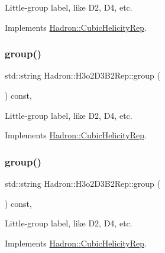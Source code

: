 Little-\/group label, like D2, D4, etc. 

Implements \mbox{\hyperlink{structHadron_1_1CubicHelicityRep_a101a7d76cd8ccdad0f272db44b766113}{Hadron\+::\+Cubic\+Helicity\+Rep}}.

\mbox{\label{structHadron_1_1H3o2D3B2Rep_a5f90a196c20d41622da336eefc77cfd1}} 
\subsubsection{\texorpdfstring{group()}{group()}\hspace{0.1cm}{\footnotesize\ttfamily [2/3]}}
{\footnotesize\ttfamily std\+::string Hadron\+::\+H3o2\+D3\+B2\+Rep\+::group (\begin{DoxyParamCaption}{ }\end{DoxyParamCaption}) const\hspace{0.3cm}{\ttfamily [inline]}, {\ttfamily [virtual]}}

Little-\/group label, like D2, D4, etc. 

Implements \mbox{\hyperlink{structHadron_1_1CubicHelicityRep_a101a7d76cd8ccdad0f272db44b766113}{Hadron\+::\+Cubic\+Helicity\+Rep}}.

\mbox{\label{structHadron_1_1H3o2D3B2Rep_a5f90a196c20d41622da336eefc77cfd1}} 
\subsubsection{\texorpdfstring{group()}{group()}\hspace{0.1cm}{\footnotesize\ttfamily [3/3]}}
{\footnotesize\ttfamily std\+::string Hadron\+::\+H3o2\+D3\+B2\+Rep\+::group (\begin{DoxyParamCaption}{ }\end{DoxyParamCaption}) const\hspace{0.3cm}{\ttfamily [inline]}, {\ttfamily [virtual]}}

Little-\/group label, like D2, D4, etc. 

Implements \mbox{\hyperlink{structHadron_1_1CubicHelicityRep_a101a7d76cd8ccdad0f272db44b766113}{Hadron\+::\+Cubic\+Helicity\+Rep}}.

